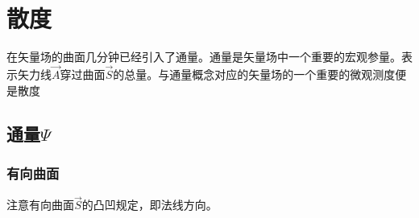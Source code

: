 \chapter{散度}

在矢量场的曲面几分钟已经引入了通量。通量是矢量场中一个重要的宏观参量。表示矢力线$ \vec{A} $穿过曲面$ \vec{S} $的总量。与通量概念对应的矢量场的一个重要的微观测度便是散度

\section{通量$\varPsi$}
\subsection{有向曲面}
注意有向曲面$ \vec{S} $的凸凹规定，即法线方向。


